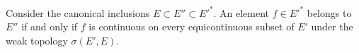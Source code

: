 Consider the canonical inclusions $E \subset E'' \subset E'^*$. An element $f \in E'^*$ belongs to $E''$ if and only if $f$ is continuous on every equicontinuous subset of $E'$ under the weak topology $\sigma(E', E)$.
